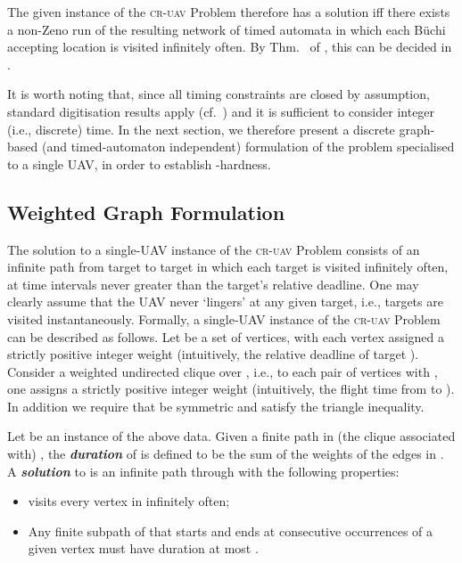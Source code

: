 \documentclass[envcountsame]{llncs}
\begin{document}
The given instance of the \textsc{cr-uav} Problem therefore has a
solution iff there exists a non-Zeno run of the resulting network of
timed automata in which each B\"uchi accepting location is visited
infinitely often. By Thm.~ of \cite{Alur1998}, this can be decided in
.

It is worth noting that, since all timing constraints are closed by
assumption, standard digitisation results apply (cf.~\cite{Henzinger1992}) and
it is sufficient to consider integer (i.e., discrete) time. In the
next section, we therefore present a discrete graph-based (and
timed-automaton independent) formulation of the problem specialised to
a single UAV, in order to establish -hardness.

\subsection{Weighted Graph Formulation}

The solution to a single-UAV instance of the \textsc{cr-uav} Problem
consists of an infinite path from target to target in which each
target is visited infinitely often, at time intervals never greater
than the target's relative deadline. One may clearly assume that the
UAV never `lingers' at any given target, i.e., targets are visited
instantaneously.  Formally, a single-UAV instance of the \textsc{cr-uav} Problem can be
described as follows. Let  be a set of  vertices, with
each vertex  assigned a strictly positive integer weight
 (intuitively, the relative deadline of target
). Consider a weighted undirected clique over , i.e., to each
pair of vertices  with , one assigns a strictly
positive integer weight  (intuitively, the flight
time from  to ). In addition we require that  be
symmetric and satisfy the triangle inequality.








Let  be an instance of
the above data. Given a finite path  in (the clique associated
with) , the \emph{\textbf{duration}}  of  is
defined to be the sum of the weights of the edges in . A
\emph{\textbf{solution}} to  is an infinite path  through  with the
following properties:
\begin{itemize}
\item  visits every vertex in  infinitely often;
\item Any finite subpath of  that starts and ends at
  consecutive occurrences of a given vertex  must have duration at
  most .
\end{itemize}
\end{document}
